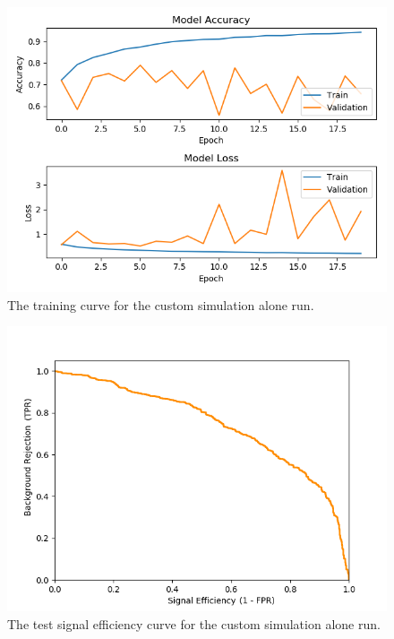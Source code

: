 \begin{figure}[ht] 
        \centering \includegraphics[width=\columnwidth]{figures/crabrun2trainlog.png}

        \caption{
                \label{fig:cr2_trainlog} The training curve for the custom simulation alone run.
        }
\end{figure}

\begin{figure}[ht] 
        \centering \includegraphics[width=\columnwidth]{figures/crabrun2_sigeff.png}

        \caption{
                \label{fig:cr2_sigeff} The test signal efficiency curve for the custom simulation alone run.
        }
\end{figure}

